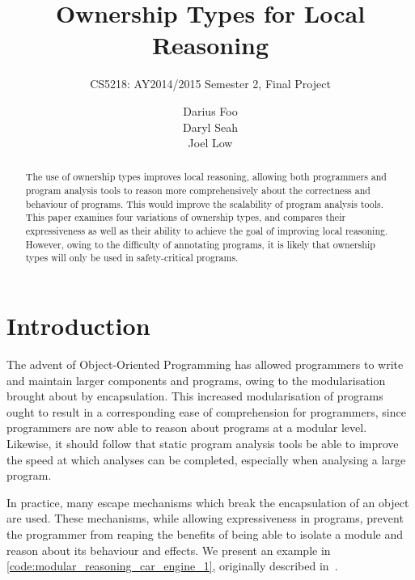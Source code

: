 \documentclass{acm_proc_article-sp}
\begin{document}
\title{Ownership Types for Local Reasoning}
\subtitle{CS5218: AY2014/2015 Semester 2, Final Project}


\author{
\alignauthor
Darius Foo\\
\alignauthor
Daryl Seah\\
\alignauthor
Joel Low\\
}



\maketitle
\begin{abstract}
The use of ownership types improves local reasoning, allowing both programmers
and program analysis tools to reason more comprehensively about the correctness
and behaviour of programs. This would improve the scalability of program
analysis tools. This paper examines four variations of ownership types, and
compares their expressiveness as well as their ability to achieve the goal of
improving local reasoning. However, owing to the difficulty of annotating
programs, it is likely that ownership types will only be used in
safety-critical programs.
\end{abstract}

\section{Introduction}
\label{sec:introduction}

The advent of Object-Oriented Programming has allowed programmers to write and
maintain larger components and programs, owing to the modularisation brought
about by encapsulation. This increased modularisation of programs ought to
result in a corresponding ease of comprehension for programmers, since
programmers are now able to reason about programs at a modular level.
Likewise, it should follow that static program analysis tools be able to
improve the speed at which analyses can be completed, especially when analysing
a large program.

In practice, many escape mechanisms which break the encapsulation of an object
are used. These mechanisms, while allowing expressiveness in programs, prevent
the programmer from reaping the benefits of being able to isolate a module and
reason about its behaviour and effects. We present an example in
\cref{code:modular_reasoning_car_engine_1}, originally
described in~\cite{clarke98ownership}.
\end{document}
